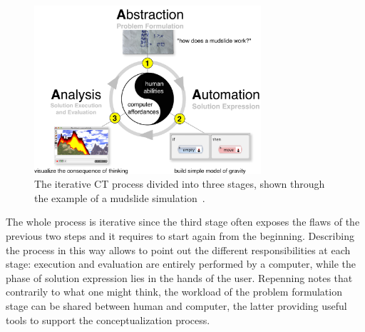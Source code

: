 \begin{figure}[ht!]
  \centering
  \includegraphics[width=0.75\textwidth]{images/c2/CTIterative.jpg} 
  \caption{The iterative \ac{CT} proc\-ess di\-vid\-ed in\-to three stages, shown through the ex\-am\-ple of a mud\-slide sim\-u\-la\-tion~\cite{Repenning:fy}.}\label{fig:ctiterative}
\end{figure}

The whole process is iterative since the third stage often exposes the flaws of the previous two steps and it requires to start again from the beginning. Describing the process in this way allows to point out the different responsibilities at each stage: execution and evaluation are entirely performed by a computer, while the phase of solution expression lies in the hands of the user. Repenning notes that contrarily to what one might think, the workload of the problem formulation stage can be shared between human and computer, the latter providing useful tools to support the conceptualization process.

